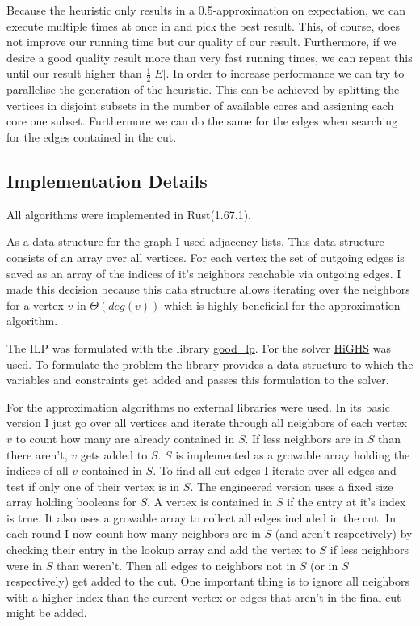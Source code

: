 \documentclass[twocolumn]{article}
\begin{document}
Because the heuristic only results in a 0.5-approximation on expectation,
we can execute multiple times at once in and pick the best result.
This, of course, does not improve our running time but our quality of our result.
Furthermore, if we desire a good quality result more than very fast running times,
we can repeat this until our result higher than $\frac{1}{2}|E|$.
In order to increase performance we can try to parallelise the generation of the heuristic.
This can be achieved by splitting the vertices in disjoint subsets in the number of available cores
and assigning each core one subset.
Furthermore we can do the same for the edges when searching for the edges contained in the cut.


\subsection{Implementation Details}

All algorithms were implemented in Rust(1.67.1).

As a data structure for the graph I used adjacency lists. This data structure consists of an array over all vertices. 
For each vertex the set of outgoing edges is saved as an array of the indices of it's neighbors reachable via outgoing edges.
I made this decision because this data structure allows iterating over the neighbors for
a vertex $v$ in $\Theta(deg(v))$ which is highly beneficial for the approximation algorithm.

The ILP was formulated with the library \href{https://crates.io/crates/good\_lp}{good\_lp}. For the solver \href{https://highs.dev/#team}{HiGHS} was used.
To formulate the problem the library provides a data structure to which the variables and constraints get added and passes this
formulation to the solver.

For the approximation algorithms no external libraries were used. 
In its basic version I just go over all vertices and iterate through all neighbors of each vertex $v$ to count how many are already contained in $S$.
If less neighbors are in $S$ than there aren't, $v$ gets added to $S$. $S$ is implemented as a growable array holding the indices of all $v$ contained in $S$.
To find all cut edges I iterate over all edges and test if only one of their vertex is in $S$.
The engineered version uses a fixed size array holding booleans for $S$. A vertex is contained in $S$ if the entry at it's index is true.
It also uses a growable array to collect all edges included in the cut. In each round I now count how many neighbors are in $S$ (and aren't respectively) by checking their entry in
the lookup array and add the vertex to $S$ if less neighbors were in $S$ than weren't. Then all edges to neighbors not in $S$ (or in $S$ respectively) get added to the cut.
One important thing is to ignore all neighbors with a higher index than the current vertex or edges that aren't in the final cut might be added.
\end{document}
